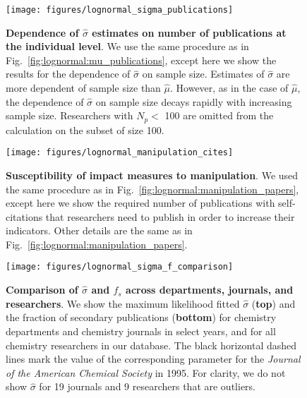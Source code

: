 \begin{figure}[t]
\texttt{[image: figures/lognormal\_sigma\_publications]}
\caption[Dependence of $\hat{\sigma}$ estimates on number of publications.]{\textbf{Dependence of $\hat{\sigma}$ estimates on number of publications at the individual level}. We use the same procedure as in Fig.~\ref{fig:lognormal:mu_publications}, except here we show the results for the dependence of $\hat{\sigma}$ on sample size. Estimates of $\hat{\sigma}$ are more dependent of sample size than $\hat{\mu}$. However, as in the case of $\hat{\mu}$, the dependence of $\hat{\sigma}$ on sample size decays rapidly with increasing sample size. Researchers with $N_p <$ 100 are omitted from the calculation on the subset of size 100.}
\label{fig:lognormal:sigma_publications}
\end{figure}

\clearpage

\begin{figure}[t]
\texttt{[image: figures/lognormal\_manipulation\_cites]}
\caption[Susceptibility of impact measures to manipulation.]{\textbf{Susceptibility of impact measures to manipulation}. We used the same procedure as in Fig.~\ref{fig:lognormal:manipulation_papers}, except here we show the required number of publications with self-citations that researchers need to publish in order to increase their indicators. Other details are the same as in Fig.~\ref{fig:lognormal:manipulation_papers}.}
\label{fig:lognormal:manipulation_cites}
\end{figure}

\clearpage

\begin{figure}[t]
\texttt{[image: figures/lognormal\_sigma\_f\_comparison]}
\caption[Comparison of $\hat{\sigma}$ and $f_s$ across departments, journals, and researchers.]{\textbf{Comparison of $\hat{\sigma}$ and $f_s$ across departments, journals, and researchers}. We show the maximum likelihood fitted $\hat{\sigma}$ (\textbf{top}) and the fraction of secondary publications (\textbf{bottom}) for chemistry departments and chemistry journals in select years, and for all chemistry researchers in our database. The black horizontal dashed lines mark the value of the corresponding parameter for the \textit{Journal of the American Chemical Society} in 1995. For clarity, we do not show $\hat{\sigma}$ for 19 journals and 9 researchers that are outliers.}
\label{fig:lognormal:sigma_f_comparison}
\end{figure}
